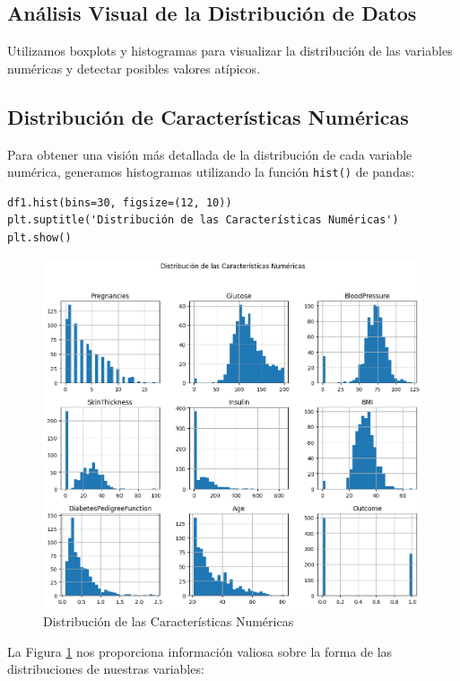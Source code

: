 \documentclass[conference]{IEEEtran}
\begin{document}
\subsection{Análisis Visual de la Distribución de Datos}

Utilizamos boxplots y histogramas para visualizar la distribución de las variables numéricas y detectar posibles valores atípicos.

\subsection{Distribución de Características Numéricas}

Para obtener una visión más detallada de la distribución de cada variable numérica, generamos histogramas utilizando la función \texttt{hist()} de pandas:

\begin{lstlisting}
df1.hist(bins=30, figsize=(12, 10))
plt.suptitle('Distribución de las Características Numéricas')
plt.show()
\end{lstlisting}

\begin{figure}[h]
\centering
\includegraphics[width=\linewidth]{distribucion_caracteristicas.png}
\caption{Distribución de las Características Numéricas}
\label{fig:dist_caracteristicas}
\end{figure}

La Figura \ref{fig:dist_caracteristicas} nos proporciona información valiosa sobre la forma de las distribuciones de nuestras variables:
\end{document}
